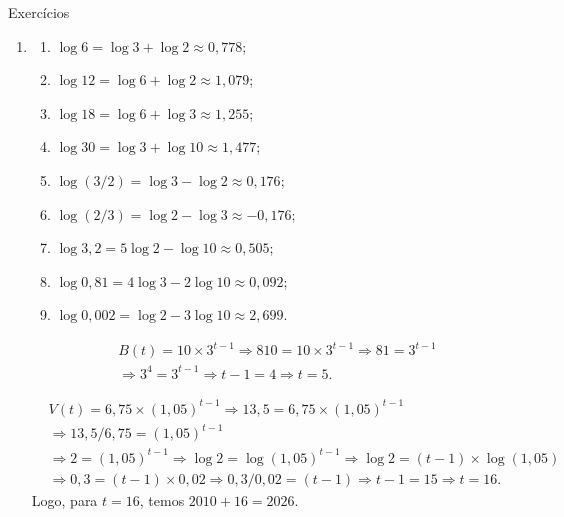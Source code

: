 \begin{answer}{Exercícios}
{
	\exerciselist
	\begin{enumerate}
	\item 
		\begin{enumerate}
		\item $\log 6 = \log 3+ \log 2 \approx 0{,}778$;
		\item $\log 12 = \log 6+ \log 2 \approx 1{,}079$;
		\item $\log 18 = \log 6+ \log 3 \approx 1{,}255$;
		\item $\log 30 = \log 3+ \log 10 \approx 1{,}477$;
		\item $\log (3/2) = \log 3 - \log 2 \approx 0{,}176$;
		\item $\log (2/3) = \log 2 - \log 3 \approx -0{,}176$;
		\item $\log 3{,}2 = 5\log 2 - \log 10 \approx 0{,}505$;
		\item $\log 0{,}81 = 4\log 3 - 2\log 10 \approx 0{,}092$;
		\item $\log 0{,}002 = \log 2 - 3\log 10 \approx 2{,}699$.
		\end{enumerate}
	\Item
		\begin{align*}
		&B(t) = 10 \times 3^{t-1} \Rightarrow  810 = 10 \times 3^{t-1}\Rightarrow  81 = 3^{t-1}\\
		&\Rightarrow  3^4 = 3^{t-1}\Rightarrow  t-1 =4\Rightarrow  t =5.
		\end{align*}
		
	\Item
		\begin{align*}
		&V(t) = 6{,}75 \times (1{,}05)^{t-1}\Rightarrow  13{,}5 = 6{,}75 \times (1{,}05)^{t-1}\\
		&\Rightarrow  13{,}5/6{,}75 =(1{,}05)^{t-1}\\
		&\Rightarrow  2 = (1{,}05)^{t-1}\Rightarrow  \log 2 = \log (1{,}05)^{t-1}\Rightarrow  \log 2 = (t-1)\times \log (1{,}05)\\
		&\Rightarrow  0{,}3 = (t-1)\times 0{,}02\Rightarrow  0{,}3/0{,}02 = (t-1)\Rightarrow  t-1=15\Rightarrow  t = 16.
		\end{align*}
		Logo, para $t = 16$, temos $2010 + 16 = 2026$.


\end{enumerate}}
\end{answer}
